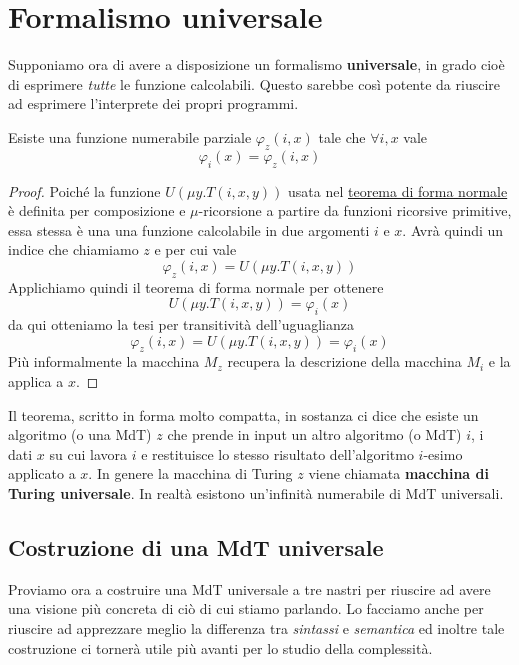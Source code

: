 \section{Formalismo universale}
Supponiamo ora di avere a disposizione un formalismo
\textbf{universale}, in grado cioè di esprimere \emph{tutte}
le funzione calcolabili. Questo sarebbe così potente da
riuscire ad esprimere l'interprete dei propri programmi.

\begin{theorem}[Enumerazione] \label{th: enum}
	Esiste una funzione numerabile parziale $\varphi_z(i, x)$
	tale che $\forall i,x$ vale
	\[ \varphi_i(x) = \varphi_z (i, x) \]
	\begin{proof}
		Poiché la funzione $U(\mu y . T(i, x, y))$ usata nel
		\hyperref[th: fn]{teorema di forma normale} è definita
		per composizione e $\mu$-ricorsione a partire da
		funzioni ricorsive primitive, essa stessa è una una
		funzione calcolabile in due argomenti $i$ e $x$. Avrà
		quindi un indice che chiamiamo $z$ e per cui vale
		\[ \varphi_z (i, x) = U(\mu y. T(i, x, y)) \]
		Applichiamo quindi il teorema di forma normale per
		ottenere
		\[ U(\mu y . T(i, x, y)) = \varphi_i (x) \]
		da qui otteniamo la tesi per transitività
		dell'uguaglianza
		\[
			\varphi_z (i, x) = U(\mu y . T(i, x, y)) =
			\varphi_i (x)
		\]
		Più informalmente la macchina $M_z$ recupera la
		descrizione della macchina $M_i$ e la applica a $x$.
	\end{proof}
\end{theorem}

Il teorema, scritto in forma molto compatta, in sostanza ci
dice che esiste un algoritmo (o una MdT) $z$ che prende in
input un altro algoritmo (o MdT) $i$, i dati $x$ su cui lavora
$i$ e restituisce lo stesso risultato dell'algoritmo $i$-esimo
applicato a $x$. In genere la macchina di Turing $z$ viene
chiamata \textbf{macchina di Turing universale}. In realtà
esistono un'infinità numerabile di MdT universali.

\subsection{Costruzione di una MdT universale}
Proviamo ora a costruire una MdT universale a tre nastri per
riuscire ad avere una visione più concreta di ciò di cui stiamo
parlando. Lo facciamo anche per riuscire ad apprezzare meglio la
differenza tra \emph{sintassi} e \emph{semantica} ed inoltre
tale costruzione ci tornerà utile più avanti per lo studio della
complessità.

